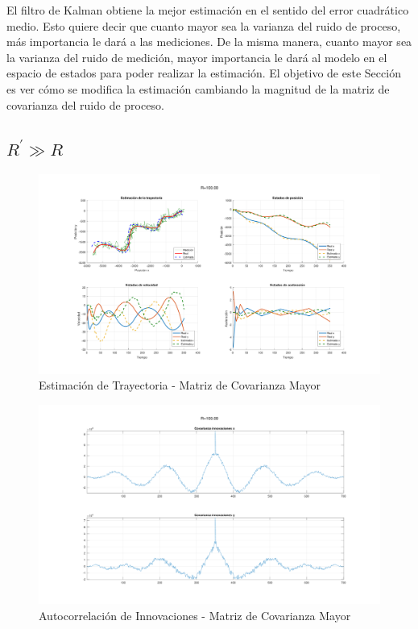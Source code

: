 
	El filtro de Kalman obtiene la mejor estimación en el sentido del error cuadrático medio. Esto quiere decir que cuanto mayor sea la varianza del ruido de proceso, más importancia le dará a las mediciones. De la misma manera, cuanto mayor sea la varianza del ruido de medición, mayor importancia le dará al modelo en el espacio de estados para poder realizar la estimación. El objetivo de este Sección es ver cómo se modifica la estimación cambiando la magnitud de la matriz de covarianza del ruido de proceso.
	
	\subsection{$R^{'}\gg R$}
	
	\begin{figure}[H]
		\centering
		\includegraphics[scale=0.5,trim={6,5cm 0 0 0}]{Figuras/graf_ej6_R1.pdf}
		\caption{Estimación de Trayectoria - Matriz de Covarianza Mayor}
		\label{fig:ej5r1}
	\end{figure}

	\begin{figure}[H]
		\centering
		\includegraphics[width=1.0\textwidth,keepaspectratio]{Figuras/covinn_ej6_R1.pdf}
		\caption{Autocorrelación de Innovaciones - Matriz de Covarianza Mayor}
		\label{fig:ej5r1_innov}
	\end{figure}

